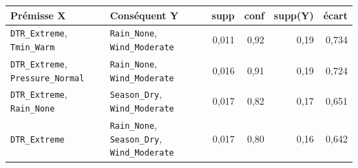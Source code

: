 \footnotesize
\begin{tabular}{>{\raggedright\arraybackslash}p{4.7cm}>{\raggedright\arraybackslash}p{4.4cm}rrrr}
\toprule
\rowcolor{NuitBleue!90}
\color{white}\textbf{Prémisse X} & \color{white}\textbf{Conséquent Y} & \color{white}\textbf{supp} & \color{white}\textbf{conf} & \color{white}\textbf{supp(Y)} & \color{white}\textbf{écart} \\
\midrule
\texttt{DTR\_Extreme}, \texttt{Tmin\_Warm} & \texttt{Rain\_None}, \texttt{Wind\_Moderate} & 0,011 & 0,92 & 0,19 & 0,734 \\
\texttt{DTR\_Extreme}, \texttt{Pressure\_Normal} & \texttt{Rain\_None}, \texttt{Wind\_Moderate} & 0,016 & 0,91 & 0,19 & 0,724 \\
\texttt{DTR\_Extreme}, \texttt{Rain\_None} & \texttt{Season\_Dry}, \texttt{Wind\_Moderate} & 0,017 & 0,82 & 0,17 & 0,651 \\
\texttt{DTR\_Extreme} & \texttt{Rain\_None}, \texttt{Season\_Dry}, \texttt{Wind\_Moderate} & 0,017 & 0,80 & 0,16 & 0,642 \\
\bottomrule
\end{tabular}

